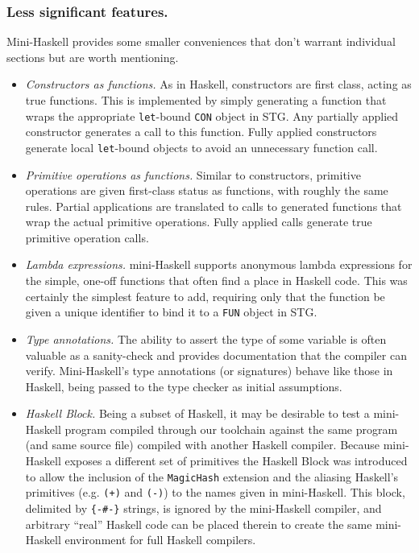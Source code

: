 \documentclass{llncs}
\begin{document}
\subsubsection{Less significant features.}

Mini-Haskell provides some smaller conveniences that don't warrant individual
sections but are worth mentioning.
\begin{itemize}
\item \emph{Constructors as functions.}
  As in Haskell, constructors are first class, acting as true functions.  This
  is implemented by simply generating a function that wraps the appropriate
  \texttt{let}-bound \texttt{CON} object in STG.  Any partially applied
  constructor generates a call to this function.  Fully applied constructors
  generate local \texttt{let}-bound objects to avoid an unnecessary function
  call.

\item \emph{Primitive operations as functions.}
  Similar to constructors, primitive operations are given first-class status as
  functions, with roughly the same rules.  Partial applications are
  translated to calls to generated functions that wrap the actual primitive
  operations. Fully applied calls generate true primitive operation calls.

\item \emph{Lambda expressions.}
  mini-Haskell supports anonymous lambda expressions for the simple, one-off
  functions that often find a place in Haskell code.  This was certainly the
  simplest feature to add, requiring only that the function be given a unique
  identifier to bind it to a \texttt{FUN} object in STG.

\item \emph{Type annotations.}  The ability to assert the type of some
  variable is often valuable as a sanity-check and provides documentation that
  the compiler can verify.  Mini-Haskell's type annotations (or signatures)
  behave like those in Haskell, being passed to the type checker as initial
  assumptions.

\item \emph{Haskell Block.}
  Being a subset of Haskell, it may be desirable to test a mini-Haskell program
  compiled through our toolchain against the same program (and same source file)
  compiled with another Haskell compiler.  Because mini-Haskell exposes a
  different set of primitives the Haskell Block was introduced to allow the
  inclusion of the \texttt{MagicHash} extension and the aliasing Haskell's
  primitives (e.g. \texttt{(+)} and \texttt{(-)}) to the names given in
  mini-Haskell.  This block, delimited by \texttt{\{-\#-\}} strings, is ignored
  by the mini-Haskell compiler, and arbitrary ``real'' Haskell code can be
  placed therein to create the same mini-Haskell environment for full Haskell
  compilers.

\end{itemize}
\end{document}
